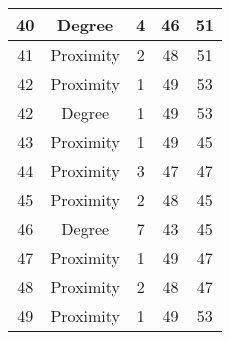 \documentclass[results.tex]{subfiles}
\begin{document}
\begin{center}
\begin{tabular}{| c || c | c | c | c |}
            \hline
            40                      & Degree                       & 4                      & 46                      & 51                   \\
            \hline
            41                      & Proximity                    & 2                      & 48                      & 51                   \\
            \hline
            42                      & Proximity                    & 1                      & 49                      & 53                   \\
            \hline
            42                      & Degree                       & 1                      & 49                      & 53                   \\
            \hline
            43                      & Proximity                    & 1                      & 49                      & 45                   \\
            \hline
            44                      & Proximity                    & 3                      & 47                      & 47                   \\
            \hline
            45                      & Proximity                    & 2                      & 48                      & 45                   \\
            \hline
            46                      & Degree                       & 7                      & 43                      & 45                   \\
            \hline
            47                      & Proximity                    & 1                      & 49                      & 47                   \\
            \hline
            48                      & Proximity                    & 2                      & 48                      & 47                   \\
            \hline
            49                      & Proximity                    & 1                      & 49                      & 53                   \\
            \hline
        \end{tabular}
    \end{center}
\end{document}
